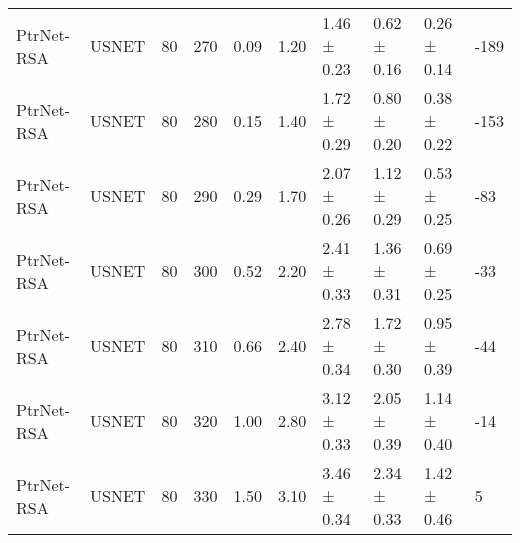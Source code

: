 \begin{longtable}[!htbp]{llll|lllll|l}
PtrNet-RSA           & USNET             & 80                   & 270                                                               & 0.09 & \multicolumn{1}{l|}{1.20}     & 1.46 ± 0.23 & 0.62 ± 0.16      & 0.26 ± 0.14       & -189                                                                                 \\
PtrNet-RSA           & USNET             & 80                   & 280                                                               & 0.15 & \multicolumn{1}{l|}{1.40}     & 1.72 ± 0.29 & 0.80 ± 0.20        & 0.38 ± 0.22       & -153                                                                                 \\
PtrNet-RSA           & USNET             & 80                   & 290                                                               & 0.29 & \multicolumn{1}{l|}{1.70}     & 2.07 ± 0.26 & 1.12 ± 0.29      & 0.53 ± 0.25       & -83                                                                                  \\
PtrNet-RSA           & USNET             & 80                   & 300                                                               & 0.52 & \multicolumn{1}{l|}{2.20}     & 2.41 ± 0.33 & 1.36 ± 0.31      & 0.69 ± 0.25       & -33                                                                                  \\
PtrNet-RSA           & USNET             & 80                   & 310                                                               & 0.66 & \multicolumn{1}{l|}{2.40}     & 2.78 ± 0.34 & 1.72 ± 0.30       & 0.95 ± 0.39       & -44                                                                                  \\
PtrNet-RSA           & USNET             & 80                   & 320                                                               & 1.00    & \multicolumn{1}{l|}{2.80}     & 3.12 ± 0.33 & 2.05 ± 0.39      & 1.14 ± 0.40        & -14                                                                                     \\
PtrNet-RSA           & USNET             & 80                   & 330                                                               & 1.50  & \multicolumn{1}{l|}{3.10}     & 3.46 ± 0.34 & 2.34 ± 0.33      & 1.42 ± 0.46       & 5                                                                                   
\end{longtable}
\twocolumn
